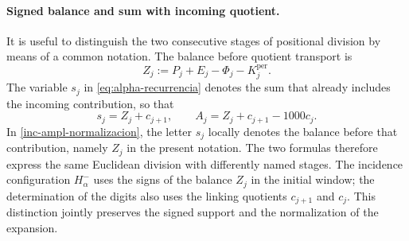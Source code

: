 \paragraph{Signed balance and sum with incoming quotient.}
\label{ampl-alfa-z-s-aclaracion}
It is useful to distinguish the two consecutive stages of positional
division by means of a common notation. The balance before quotient
transport is
\[
 Z_j:=P_j+E_j-\Phi_j-K_j^{\mathrm{per}}.
\]
The variable $s_j$ in \eqref{eq:alpha-recurrencia} denotes the sum that
already includes the incoming contribution, so that
\[
 s_j=Z_j+c_{j+1},\qquad
 A_j=Z_j+c_{j+1}-1000c_j.
\]
In \eqref{inc-ampl-normalizacion}, the letter $s_j$ locally denotes
the balance before that contribution, namely $Z_j$ in the present
notation. The two formulas therefore express the same Euclidean
division with differently named stages. The incidence configuration
$H^-_\alpha$ uses the signs of the balance $Z_j$ in the initial window;
the determination of the digits also uses the linking quotients
$c_{j+1}$ and $c_j$. This distinction jointly preserves the signed
support and the normalization of the expansion.
